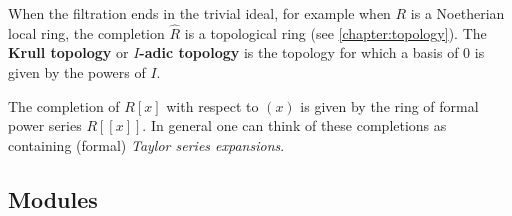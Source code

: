     \begin{property}
        When the filtration ends in the trivial ideal, for example when $R$ is a Noetherian local ring, the completion $\widehat{R}$ is a topological ring (see \cref{chapter:topology}). The \textbf{Krull topology} or \textbf{$I$-adic topology} is the topology for which a basis of $0$ is given by the powers of $I$.
    \end{property}

    \begin{example}
        The completion of $R[x]$ with respect to $(x)$ is given by the ring of formal power series $R[[x]]$. In general one can think of these completions as containing (formal) \textit{Taylor series expansions}.
    \end{example}

\subsection{Modules}

